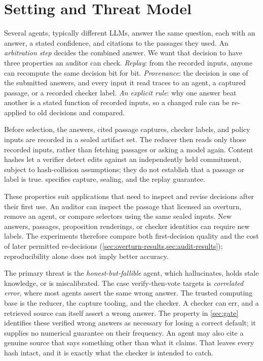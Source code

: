 \section{Setting and Threat Model}
\label{sec:setting}

Several agents, typically different LLMs, answer the same question, each with an answer, a stated confidence, and citations to the passages they used. An \emph{arbitration step} decides the combined answer. We want that decision to have three properties an auditor can check. \emph{Replay}: from the recorded inputs, anyone can recompute the same decision bit for bit. \emph{Provenance}: the decision is one of the submitted answers, and every input it read traces to an agent, a captured passage, or a recorded checker label. \emph{An explicit rule}: why one answer beat another is a stated function of recorded inputs, so a changed rule can be re-applied to old decisions and compared.

Before selection, the answers, cited passage captures, checker labels, and policy inputs are recorded in a sealed artifact set. The reducer then reads only those recorded inputs, rather than fetching passages or asking a model again. Content hashes let a verifier detect edits against an independently held commitment, subject to hash-collision assumptions; they do not establish that a passage or label is true.  specifies capture, sealing, and the replay guarantee.

These properties suit applications that need to inspect and revise decisions after their first use. An auditor can inspect the passage that licensed an overturn, remove an agent, or compare selectors using the same sealed inputs. New answers, passages, proposition renderings, or checker identities can require new labels. The experiments therefore compare both first-decision quality and the cost of later permitted re-decisions (\cref{sec:overturn-results,sec:audit-results}); reproducibility alone does not imply better accuracy.

The primary threat is the \emph{honest-but-fallible} agent, which hallucinates, holds stale knowledge, or is miscalibrated. The case verify-then-vote targets is \emph{correlated error}, where most agents assert the same wrong answer. The trusted computing base is the reducer, the capture tooling, and the checker. A checker can err, and a retrieved source can itself assert a wrong answer. The property in \cref{sec:gate} identifies these verified wrong answers as necessary for losing a correct default; it supplies no numerical guarantee on their frequency. An agent may also cite a genuine source that says something other than what it claims. That leaves every hash intact, and it is exactly what the checker is intended to catch.
